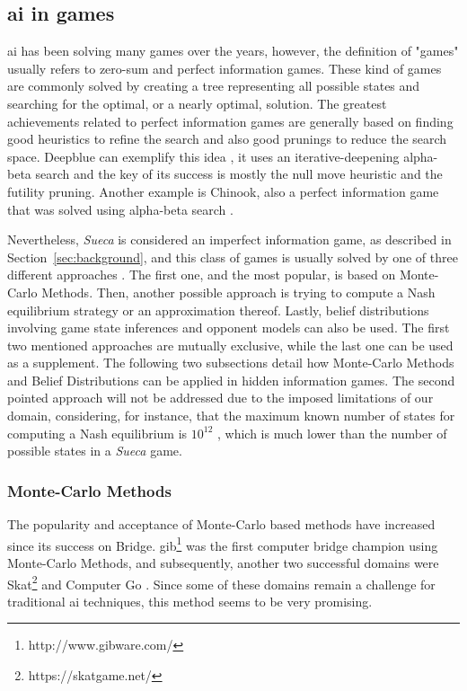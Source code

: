\subsection{\gls{ai} in games}
 
\gls{ai} has been solving many games over the years, however, the definition of "games" usually refers to zero-sum and perfect information games.
These kind of games are commonly solved by creating a tree representing all possible states and searching for the optimal, or a nearly optimal, solution.
The greatest achievements related to perfect information games are generally based on finding good heuristics to refine the search and also good prunings to reduce the search space.
Deepblue can exemplify this idea \cite{Campbell2002}, it uses an iterative-deepening alpha-beta search and the key of its success is mostly the null move heuristic and the futility pruning.
Another example is Chinook, also a perfect information game that was solved using alpha-beta search \cite{Schaeffer1996}.

Nevertheless, \emph{Sueca} is considered an imperfect information game, as described in Section~\ref{sec:background}, and this class of games is usually solved by one of three different approaches \cite{Cowling2012}.
The first one, and the most popular, is based on Monte-Carlo Methods.
Then, another possible approach is trying to compute a Nash equilibrium strategy or an approximation thereof.
Lastly, belief distributions involving game state inferences and opponent models can also be used.
The first two mentioned approaches are mutually exclusive, while the last one can be used as a supplement.
The following two subsections detail how Monte-Carlo Methods and Belief Distributions can be applied in hidden information games.
The second pointed approach will not be addressed due to the imposed limitations of our domain, considering, for instance, that the maximum known number of states for computing a Nash equilibrium is $10^{12}$ \cite{Zinkevich}, which is much lower than the number of possible states in a \emph{Sueca} game.




\subsubsection{Monte-Carlo Methods}

The popularity and acceptance of Monte-Carlo based methods have increased since its success on Bridge.
\gls{gib}\footnote{http://www.gibware.com/} was the first computer bridge champion using Monte-Carlo Methods, and subsequently, another two successful domains were Skat\footnote{https://skatgame.net/} and Computer Go \cite{Gelly2011}.
Since some of these domains remain a challenge for traditional \gls{ai} techniques, this method seems to be very promising.


